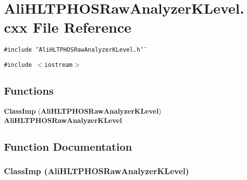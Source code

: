 \section{Ali\-HLTPHOSRaw\-Analyzer\-KLevel.cxx File Reference}
\label{AliHLTPHOSRawAnalyzerKLevel_8cxx}
{\tt \#include \char`\"{}Ali\-HLTPHOSRaw\-Analyzer\-KLevel.h\char`\"{}}\par
{\tt \#include $<$iostream$>$}\par
\subsection*{Functions}
\begin{CompactItemize}
\item 
{\bf Class\-Imp} ({\bf Ali\-HLTPHOSRaw\-Analyzer\-KLevel}) {\bf Ali\-HLTPHOSRaw\-Analyzer\-KLevel}
\end{CompactItemize}


\subsection{Function Documentation}
\subsubsection{\setlength{\rightskip}{0pt plus 5cm}Class\-Imp ({\bf Ali\-HLTPHOSRaw\-Analyzer\-KLevel})}\label{AliHLTPHOSRawAnalyzerKLevel_8cxx_a0}


